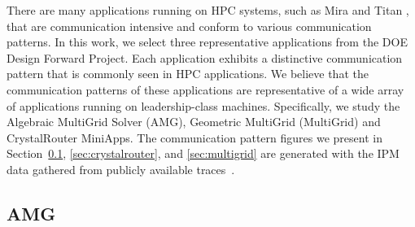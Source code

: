 \documentclass[conference]{IEEEtran}
\begin{document}
There are many applications running on HPC systems, such as Mira \cite{bgq} and Titan \cite{titan}, that are communication intensive and conform to various communication patterns. In this work, we select three representative applications from the DOE Design Forward Project. Each application exhibits a distinctive communication pattern that is commonly seen in HPC applications. We believe that the communication patterns of these applications are representative of a wide array of applications running on leadership-class machines. Specifically, we study the Algebraic MultiGrid Solver (AMG), Geometric MultiGrid (MultiGrid) and CrystalRouter MiniApps. The communication pattern figures we present in Section~\ref{sec:amg}, \ref{sec:crystalrouter}, and \ref{sec:multigrid} are generated with the IPM~\cite{ipm} data gathered from publicly available traces~\cite{designforwardwebpage}.



\subsection{AMG}
\label{sec:amg}
\end{document}
